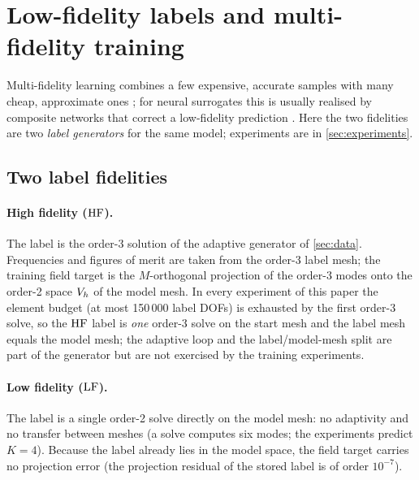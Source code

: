 \section{Low-fidelity labels and multi-fidelity training}\label{sec:multifidelity}

Multi-fidelity learning combines a few expensive, accurate samples with many cheap, approximate ones
\citep{kennedy2000predicting,peherstorfer2018survey}; for neural surrogates this is usually realised by composite
networks that correct a low-fidelity prediction \citep{meng2020composite,lu2022multifidelity,howard2023multifidelity}.
Here the two fidelities are two \emph{label generators} for the same model; experiments are in \cref{sec:experiments}.

\subsection{Two label fidelities}\label{sec:06-defs}

\paragraph{High fidelity ($\mathrm{HF}$).} The label is the order-3 solution of the adaptive generator of \cref{sec:data}.
Frequencies and figures of merit are taken from the order-3 label mesh; the training field target is the
$M$-orthogonal projection of the order-3 modes onto the order-2 space $V_h$ of the model mesh. In every experiment of
this paper the element budget (at most 150\,000 label DOFs) is exhausted by the first order-3 solve, so the $\mathrm{HF}$
label is \emph{one} order-3 solve on the start mesh and the label mesh equals the model mesh; the adaptive loop and
the label/model-mesh split are part of the generator but are not exercised by the training experiments.

\paragraph{Low fidelity ($\mathrm{LF}$).} The label is a single order-2 solve directly on the model mesh: no adaptivity and no
transfer between meshes (a solve computes six modes; the experiments predict $K=4$). Because the label already lies
in the model space, the field target carries no projection error (the projection residual of the stored label is of
order $10^{-7}$).

